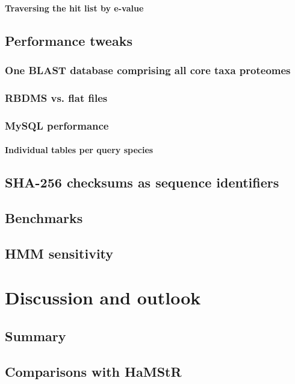 \documentclass[a4paper,12pt]{scrreprt}
\newcommand{\hamstr}{HaMStR\xspace}
\begin{document}
		\subsubsection{Traversing the hit list by e-value}
		
	\section{Performance tweaks}
		\subsection{One BLAST database comprising all core taxa proteomes}
			
		\subsection{RBDMS vs. flat files}
		\subsection{MySQL performance}
		\subsubsection{Individual tables per query species}
	\section{SHA-256 checksums as sequence identifiers}
		
	\section{Benchmarks}
	\section{HMM sensitivity}
		

\chapter{Discussion and outlook}
	
	\section{Summary}
	\section{Comparisons with \hamstr}
	\clearpage
\end{document}
